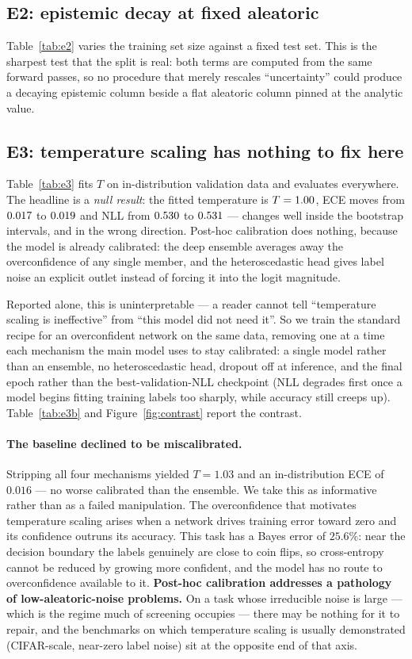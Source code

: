 \documentclass{article}
\begin{document}
\subsection{E2: epistemic decay at fixed aleatoric}
\label{sec:e2}
Table~\ref{tab:e2} varies the training set size against a fixed test set. This is
the sharpest test that the split is real: both terms are computed from the same
forward passes, so no procedure that merely rescales ``uncertainty'' could
produce a decaying epistemic column beside a flat aleatoric column pinned at the
analytic value.

\subsection{E3: temperature scaling has nothing to fix here}
\label{sec:e3}
Table~\ref{tab:e3} fits $T$ on in-distribution validation data and evaluates
everywhere. The headline is a \emph{null result}: the fitted temperature is
$T = 1.00$, ECE moves from $0.017$ to $0.019$ and NLL from $0.530$ to
$0.531$ --- changes well inside the bootstrap intervals, and in the wrong
direction. Post-hoc calibration does nothing, because the model is already
calibrated: the deep ensemble averages away the overconfidence of any single
member, and the heteroscedastic head gives label noise an explicit outlet
instead of forcing it into the logit magnitude.

Reported alone, this is uninterpretable --- a reader cannot tell ``temperature
scaling is ineffective'' from ``this model did not need it''. So we train the
standard recipe for an overconfident network on the same data, removing one at a
time each mechanism the main model uses to stay calibrated: a single model rather
than an ensemble, no heteroscedastic head, dropout off at inference, and the
final epoch rather than the best-validation-NLL checkpoint (NLL degrades first
once a model begins fitting training labels too sharply, while accuracy still
creeps up). Table~\ref{tab:e3b} and Figure~\ref{fig:contrast} report the
contrast.

\paragraph{The baseline declined to be miscalibrated.} Stripping all four
mechanisms yielded $T = 1.03$ and an in-distribution ECE of $0.016$ --- no worse
calibrated than the ensemble. We take this as informative rather than as a failed
manipulation. The overconfidence that motivates temperature scaling
\citep{guo2017calibration} arises when a network drives training error toward
zero and its confidence outruns its accuracy. This task has a Bayes error of
$25.6\%$: near the decision boundary the labels genuinely are close to coin
flips, so cross-entropy cannot be reduced by growing more confident, and the
model has no route to overconfidence available to it. \textbf{Post-hoc
calibration addresses a pathology of low-aleatoric-noise problems.} On a task
whose irreducible noise is large --- which is the regime much of screening
occupies --- there may be nothing for it to repair, and the benchmarks on which
temperature scaling is usually demonstrated (CIFAR-scale, near-zero label noise)
sit at the opposite end of that axis.
\end{document}
